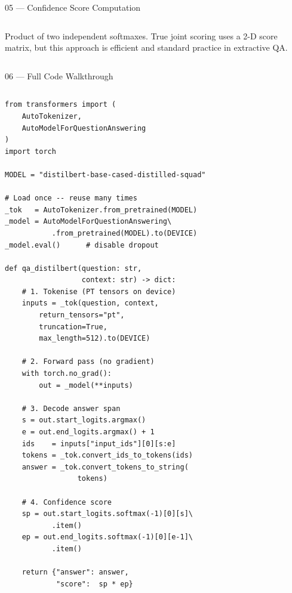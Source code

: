 \documentclass[aspectratio=169,12pt]{beamer}
\begin{document}
\begin{frame}{05 --- Confidence Score Computation}
\begin{columns}[T]

\vspace{0.4cm}
{\scriptsize\color{SlateGray}
Product of two independent softmaxes. True joint
scoring uses a 2-D score matrix, but this approach
is efficient and standard practice in extractive QA.}
\end{columns}
\end{frame}

\begin{frame}[fragile]{06 --- Full Code Walkthrough}
\vspace{0.1cm}
\begin{columns}[T]
\begin{lstlisting}[style=py,title={\texttt{distilbert\_qa.py}}]
from transformers import (
    AutoTokenizer,
    AutoModelForQuestionAnswering
)
import torch

MODEL = "distilbert-base-cased-distilled-squad"

# Load once -- reuse many times
_tok   = AutoTokenizer.from_pretrained(MODEL)
_model = AutoModelForQuestionAnswering\
           .from_pretrained(MODEL).to(DEVICE)
_model.eval()      # disable dropout

def qa_distilbert(question: str,
                  context: str) -> dict:
    # 1. Tokenise (PT tensors on device)
    inputs = _tok(question, context,
        return_tensors="pt",
        truncation=True,
        max_length=512).to(DEVICE)

    # 2. Forward pass (no gradient)
    with torch.no_grad():
        out = _model(**inputs)

    # 3. Decode answer span
    s = out.start_logits.argmax()
    e = out.end_logits.argmax() + 1
    ids    = inputs["input_ids"][0][s:e]
    tokens = _tok.convert_ids_to_tokens(ids)
    answer = _tok.convert_tokens_to_string(
                 tokens)

    # 4. Confidence score
    sp = out.start_logits.softmax(-1)[0][s]\
           .item()
    ep = out.end_logits.softmax(-1)[0][e-1]\
           .item()

    return {"answer": answer,
            "score":  sp * ep}
\end{lstlisting}

\vspace{0.2cm}


\end{columns}
\end{frame}
\end{document}
